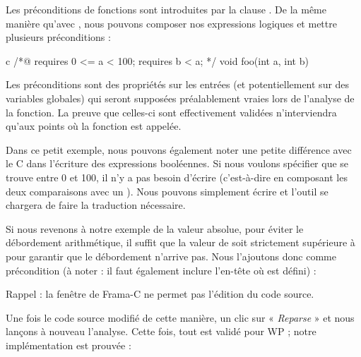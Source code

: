 

Les préconditions de fonctions sont introduites par la clause .
De la même manière qu'avec , nous pouvons composer nos
expressions logiques et mettre plusieurs préconditions :



\begin{CodeBlock}{c}
/*@
  requires 0 <= a < 100;
  requires b < a;
*/
void foo(int a, int b){

}
\end{CodeBlock}



Les préconditions sont des propriétés sur les entrées (et potentiellement sur
des variables globales) qui seront supposées préalablement vraies lors de
l'analyse de la fonction. La preuve que celles-ci sont effectivement validées
n'interviendra qu'aux points où la fonction est appelée.



Dans ce petit exemple, nous pouvons également noter une petite différence avec
le C dans l'écriture des expressions booléennes. Si nous voulons spécifier
que  se trouve entre 0 et 100, il n'y a pas besoin d'écrire 
(c'est-à-dire en composant les deux comparaisons avec un \CodeInline{\&\&}). Nous
pouvons simplement écrire  et l'outil se chargera de faire
la traduction nécessaire.



Si nous revenons à notre exemple de la valeur absolue, pour éviter le
débordement arithmétique, il suffit que la valeur de  soit
strictement  supérieure à  pour garantir que le
débordement n'arrive pas.
Nous l'ajoutons donc comme précondition (à noter : il faut également
inclure l'en-tête où  est défini) :






\begin{Warning}
Rappel : la fenêtre de Frama-C ne permet pas l'édition du code source.
\end{Warning}


Une fois le code source modifié de cette manière, un clic sur « \textit{Reparse} » et
nous lançons à nouveau l'analyse. Cette fois, tout est validé pour WP ; notre
implémentation est prouvée :




